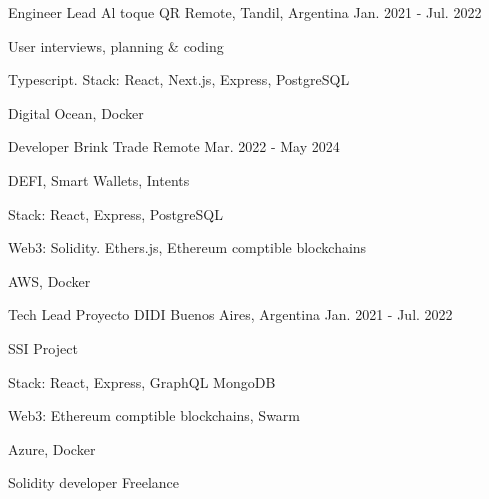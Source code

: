


\begin{cventries}
\cventry
{Engineer Lead} %
{Al toque QR} %
{Remote, Tandil, Argentina} %
{Jan. 2021 - Jul. 2022} %
{ %
\begin{cvitems}
\item {User interviews, planning \& coding}
\item {Typescript. Stack: React, Next.js, Express, PostgreSQL}
\item {Digital Ocean, Docker}
\end{cvitems}
}
\cventry
{Developer} %
{Brink Trade} %
{Remote} %
{Mar. 2022 - May 2024} %
{ %
\begin{cvitems}
\item {DEFI, Smart Wallets, Intents}
\item {Stack: React, Express, PostgreSQL}
\item {Web3: Solidity. Ethers.js, Ethereum comptible blockchains}
\item {AWS, Docker}
\end{cvitems}
}
\cventry
{Tech Lead} %
{Proyecto DIDI} %
{Buenos Aires, Argentina} %
{Jan. 2021 - Jul. 2022} %
{ %
\begin{cvitems}
\item {SSI Project}
\item {Stack: React, Express, GraphQL MongoDB}
\item {Web3: Ethereum comptible blockchains, Swarm}
\item {Azure, Docker}
\end{cvitems}
}
\cventry
{Solidity developer} %
{Freelance} %

\end{cventries}
